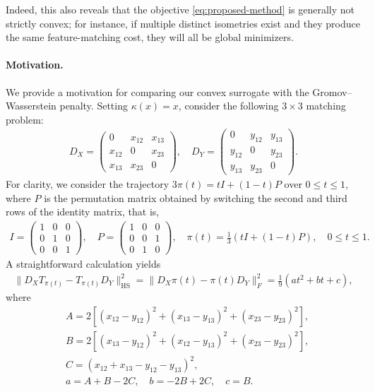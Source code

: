 \documentclass{article}
\begin{document}
Indeed, this also reveals that the objective \eqref{eq:proposed-method} is generally not strictly convex; for instance, if multiple distinct isometries exist and they produce the same feature-matching cost, they will all be global minimizers.

\paragraph{Motivation.}  
We provide a motivation for comparing our convex surrogate with the Gromov--Wasserstein penalty.  
Setting $\kappa(x) = x$, consider the following $3 \times 3$ matching problem:
\begin{align*}
	D_X = \begin{pmatrix}
		0 & x_{12} & x_{13} \\
		x_{12} & 0 & x_{23} \\
		x_{13} & x_{23} & 0
	\end{pmatrix} , 
	\quad
	D_Y = \begin{pmatrix}
		0 & y_{12} & y_{13} \\
		y_{12} & 0 & y_{23} \\
		y_{13} & y_{23} & 0
	\end{pmatrix} .
\end{align*}
For clarity, we consider the trajectory $3\pi(t) = tI + (1-t)P$ over $0 \leq t \leq 1$,  
where $P$ is the permutation matrix obtained by switching the second and third rows of the identity matrix, that is,
\begin{align*}
	I = \begin{pmatrix}
		1 & 0 & 0 \\
		0 & 1 & 0 \\
		0 & 0 & 1
	\end{pmatrix} , \quad
	P = \begin{pmatrix}
		1 & 0 & 0 \\
		0 & 0 & 1 \\
		0 & 1 & 0
	\end{pmatrix} , \quad
	\pi(t) = \frac{1}{3} \left(tI + (1-t)P\right) , \quad 0 \leq t \leq 1 . 
\end{align*} 
A straightforward calculation yields
\begin{align*}
	\|D_XT_{\pi(t)} - T_{\pi(t)}D_Y \|_{\mathrm{HS}}^2 = \| D_X\pi(t) - \pi(t)D_Y \|_F^2 = \frac{1}{9}(at^2 + bt + c) ,
\end{align*}
where
\begin{align*}
	&A = 2\left[(x_{12} - y_{12})^2 + (x_{13} - y_{13})^2 + (x_{23} - y_{23})^2\right] , \\
	&B = 2\left[(x_{13} - y_{12})^2 + (x_{12} - y_{13})^2 + (x_{23} - y_{23})^2\right] , \\
	&C = (x_{12} + x_{13} - y_{12} - y_{13})^2 , \\[5pt]
	&a = A + B - 2C , \quad b = -2B + 2C , \quad c = B .
\end{align*}
\end{document}
